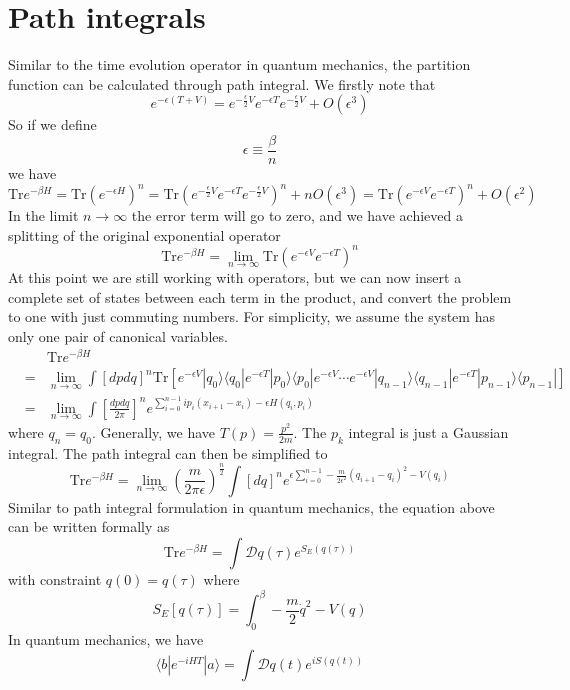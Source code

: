 \documentclass[cyan]{elegantnote}
\begin{document}
\section{Path integrals}
Similar to the time evolution operator in quantum mechanics, the partition function can be calculated through path integral. We firstly note that
\[e^{-\epsilon(T+V)} = e^{-\frac{\epsilon}{2} V}e^{-\epsilon T} e^{-\frac{\epsilon}{2} V} + O(\epsilon^3)\]
So if we define
\[\epsilon \equiv \frac{\beta}{n}\]
we have
\[\mathrm{Tr}e^{-\beta H} = \mathrm{Tr} \left( e^{-\epsilon H} \right)^n = \mathrm{Tr} \left(e^{-\frac{\epsilon}{2} V}e^{-\epsilon T} e^{-\frac{\epsilon}{2} V}\right)^n + nO(\epsilon^3) = \mathrm{Tr} \left(e^{-\epsilon V}e^{-\epsilon T} \right)^n + O(\epsilon^2)\]
In the limit $n \to \infty$ the error term will go to zero, and we have achieved a splitting of the original exponential operator
\[\mathrm{Tr}e^{-\beta H} = \lim_{n \to \infty} \mathrm{Tr} \left(e^{-\epsilon V}e^{-\epsilon T} \right)^n\]
At this point we are still working with operators, but we can now insert a complete set of states between each term in the product, and convert the problem to one with just commuting numbers. For simplicity, we assume the system has only one pair of canonical variables.
\begin{eqnarray}
&\phantom{=}& \mathrm{Tr}e^{-\beta H} \nonumber \\
&=& \lim_{n \to \infty} \int [dpdq]^n  \mathrm{Tr} [ e^{-\epsilon V}|q_0\rangle \langle q_0 | e^{-\epsilon T} |p_0 \rangle\langle p_0| e^{-\epsilon V} \cdots e^{-\epsilon V} |q_{n-1}\rangle\langle q_{n-1}| e^{-\epsilon T} |p_{n-1}\rangle\langle p_{n-1} | ] \nonumber \\
&=& \lim_{n \to \infty} \int [\frac{dpdq}{2\pi}]^n e^{\sum_{i=0}^{n-1}ip_i(x_{i+1}-x_i) - \epsilon H(q_i,p_i)} \nonumber
\end{eqnarray}
where $q_{n} = q_0$. 
Generally, we have $T(p) = \frac{p^2}{2m}$. The $p_k$ integral is just a Gaussian integral. The path integral can then be simplified to
\[\mathrm{Tr}e^{-\beta H} = \lim_{n \to \infty} \left( \frac{m}{2\pi \epsilon} \right)^{\frac{n}{2}} \int [dq]^n e^{\epsilon \sum_{i=0}^{n-1}  -\frac{m}{2\epsilon^2}(q_{i+1}-q_i)^2 -  V(q_i)} \]
Similar to path integral formulation in quantum mechanics, the equation above can be written formally as
\[\mathrm{Tr}e^{-\beta H} = \int \mathcal{D}q(\tau) e^{S_E(q(\tau))}\]
with constraint $q(0) = q(\tau)$
where
\[S_E[q(\tau)] = \int_0^{\beta} -\frac{m}{2}\dot{q}^2 - V(q)\]
In quantum mechanics, we have
\[\langle b | e^{-iHT} | a \rangle = \int \mathcal{D}q(t) e^{iS(q(t))}\]
\end{document}
